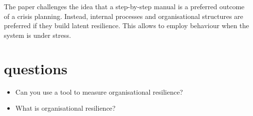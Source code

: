 The paper challenges the idea that a step-by-step manual is a preferred outcome of a crisis planning. 
Instead, internal processes and organisational structures are preferred if they build latent resilience. 
This allows to employ behaviour when the system is under stress.

\section{questions}
\begin{itemize}
  \item Can you use a tool to measure organisational resilience?
  \item What is organisational resilience?
\end{itemize}

